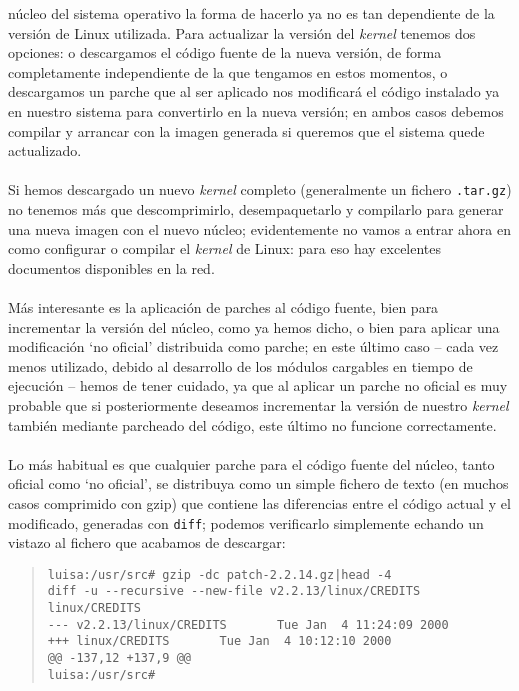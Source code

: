 n\'ucleo del sistema operativo la forma de hacerlo ya no es tan dependiente de 
la versi\'on de Linux utilizada. Para actualizar la versi\'on del {\it kernel}
tenemos dos opciones: o descargamos el c\'odigo fuente de la nueva versi\'on,
de forma completamente independiente de la que tengamos en estos momentos, o
descargamos un parche que al ser aplicado nos modificar\'a el c\'odigo 
instalado ya en nuestro sistema para convertirlo en la nueva versi\'on; en ambos
casos debemos compilar y arrancar con la imagen generada si queremos que el 
sistema quede actualizado.\\
\\Si hemos descargado un nuevo {\it kernel} completo (generalmente un fichero
{\tt .tar.gz}) no tenemos m\'as que descomprimirlo, desempaquetarlo y 
compilarlo para generar una nueva imagen con el nuevo n\'ucleo; evidentemente
no vamos a entrar ahora en como configurar o compilar el {\it kernel} de Linux:
para eso hay excelentes documentos disponibles en la red.\\
\\M\'as interesante es la aplicaci\'on de parches al c\'odigo fuente, bien para
incrementar la versi\'on del n\'ucleo, como ya hemos dicho, o bien para aplicar
una modificaci\'on `no oficial' distribuida como parche; en este \'ultimo caso
-- cada vez menos utilizado, debido al desarrollo de los m\'odulos cargables
en tiempo de ejecuci\'on -- hemos de tener cuidado, ya que al aplicar un parche
no oficial es muy probable que si posteriormente deseamos incrementar la
versi\'on de nuestro {\it kernel} tambi\'en mediante parcheado del c\'odigo, 
este \'ultimo no funcione correctamente.\\
\\Lo m\'as habitual es que cualquier parche para el c\'odigo fuente del 
n\'ucleo, tanto oficial como `no oficial', se distribuya como un simple fichero
de texto (en muchos casos comprimido con gzip) que contiene las diferencias 
entre el c\'odigo actual y el modificado, generadas con {\tt diff}; podemos 
verificarlo simplemente echando un vistazo al fichero que acabamos de descargar:
\begin{quote}
\begin{verbatim}
luisa:/usr/src# gzip -dc patch-2.2.14.gz|head -4
diff -u --recursive --new-file v2.2.13/linux/CREDITS linux/CREDITS
--- v2.2.13/linux/CREDITS       Tue Jan  4 11:24:09 2000
+++ linux/CREDITS       Tue Jan  4 10:12:10 2000
@@ -137,12 +137,9 @@
luisa:/usr/src# 
\end{verbatim}
\end{quote}
